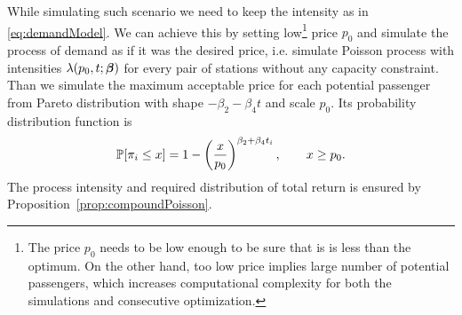 While simulating such scenario we need to keep the intensity as in \eqref{eq:demandModel}.
We can achieve this by setting low\footnote{The price $p_0$ needs to be low enough to be sure that is is less than the optimum. On the other hand, too low price implies large number of potential passengers, which increases computational complexity for both the simulations and consecutive optimization.} price $p_0$ and simulate the process of demand as if it was the desired price, i.e. simulate Poisson process with intensities $\lambda (p_0, t; \bm{\beta})$ for every pair of stations without any capacity constraint. Than we simulate the maximum acceptable price for each potential passenger from Pareto distribution with shape $-\beta_2 - \beta_4 t$ and scale $p_0$. Its probability distribution function is
\[
	\operatorname{\mathbb{P}} [\pi_i \leq x] = 1 - \left( \frac{x}{p_0} \right)^{\beta_2 + \beta_4 t_i}, \qquad x \geq p_0.
\]
The process intensity and required distribution of total return is ensured by Proposition~\ref{prop:compoundPoisson}.



